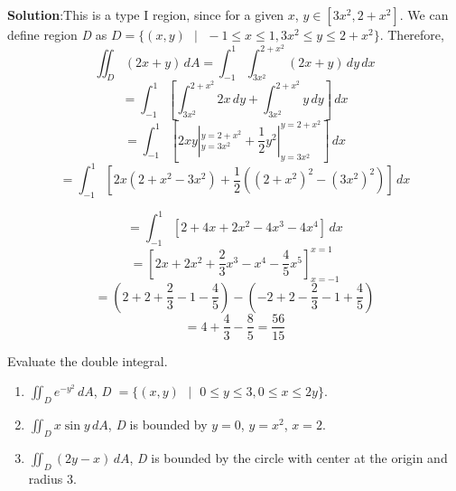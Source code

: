 \textbf{Solution}:This is a type I region, since for a given $x$, $y \in \left[
3x^2, 2 + x^2 \right]$. We can define region \textit{D} as $\textit{D} = \{(x, 
y) \text{ }|\text{ } -1 \leq x \leq 1, 3x^2 \leq y \leq 2 + x^2 \}$. Therefore, 
$$\iint_{\textit{D}} (2x + y)\,dA = \int_{-1}^1 \int_{3x^2}^{2 + x^2} \left(2x 
+ y \right)\,dy\,dx$$
$$= \int_{-1}^1 \left[ \int_{3x^2}^{2 + x^2} 2x\,dy + \int_{3x^2}^{2 + x^2} y
\,dy \right]\,dx$$
$$= \int_{-1}^{1} \left[ 2xy|_{y = 3x^2}^{y = 2 + x^2} + \frac{1}{2}y^2|_{y = 
3x^2}^{y = 2+x^2} \right]\,dx$$
$$= \int_{-1}^1 \left[ 2x \left( 2 + x^2 - 3x^2 \right) + \frac{1}{2} \left( 
(2 + x^2)^2 - (3x^2)^2 \right) \right]\,dx$$

$$= \int_{-1}^1 \left[ 2 + 4x + 2x^2 - 4x^3 - 4x^4 \right]\,dx$$
$$= \left[ 2x + 2x^2 + \frac{2}{3}x^3 - x^4 - \frac{4}{5}x^5 \right]_{x = -1}^{
x = 1}$$
$$= \left( 2 + 2 + \frac{2}{3} - 1 - \frac{4}{5} \right) - \left( -2 + 2 - 
\frac{2}{3} - 1 + \frac{4}{5} \right)$$
$$= 4 + \frac{4}{3} - \frac{8}{5} = \frac{56}{15}$$

\begin{Exercise}[title = {Double Integrals over Non-Rectangular Regions}, 
label = non-rect]
Evaluate the double integral.
\begin{enumerate}
\item $\iint_{\textit{D}} e^{-y^2} \,dA$, \textit{D} $= \{(x, y) \text{ } | 
\text{ } 0 \leq y \leq 3, 0 \leq x \leq 2y \}$.
\item $\iint_{\textit{D}} x \sin{y}\,dA$, \textit{D} is bounded by $y = 0$, 
$y = x^2$, $x = 2$. 
\item $\iint_{\textit{D}} \left(2y - x \right)\,dA$, \textit{D} is bounded by 
the circle with center at the origin and radius 3. 
\end{enumerate}
\end{Exercise}

